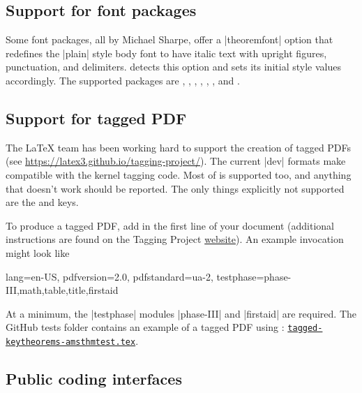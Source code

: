 \documentclass{ltxdoc}
\begin{document}
\subsection{Support for font packages}

Some font packages, all by Michael Sharpe, offer a |theoremfont| option that redefines the |plain| style body font to have italic text with upright figures, punctuation, and delimiters.  detects this option and sets its initial style values accordingly. The supported packages are , , , , , , and .

\subsection{Support for tagged PDF}

The \LaTeX{} team has been working hard to support the creation of tagged PDFs (see \url{https://latex3.github.io/tagging-project/}).
The current |dev| formats make  compatible with the kernel tagging code.
Most of  is supported too, and anything that doesn't work should be reported.
The only things explicitly not supported are the  and  keys.

To produce a tagged PDF, add  in the first line of your document (additional instructions are found on the Tagging Project \href{https://latex3.github.io/tagging-project/documentation/prototype-usage-instructions.html}{website}).
An example invocation might look like

\begin{dispListing}
\DocumentMetadata
  {
    lang=en-US,
    pdfversion=2.0,
    pdfstandard=ua-2,
    testphase={phase-III,math,table,title,firstaid}
  }
\end{dispListing}

At a minimum, the |testphase| modules |phase-III| and |firstaid| are required.
The GitHub tests folder contains an example of a tagged PDF using : \href{https://github.com/mbertucci47/keytheorems/blob/main/tests/tagged-keytheorems-amsthmtest.tex}{\texttt{tagged-keytheorems-amsthmtest.tex}}.

\subsection{Public coding interfaces}
\end{document}
